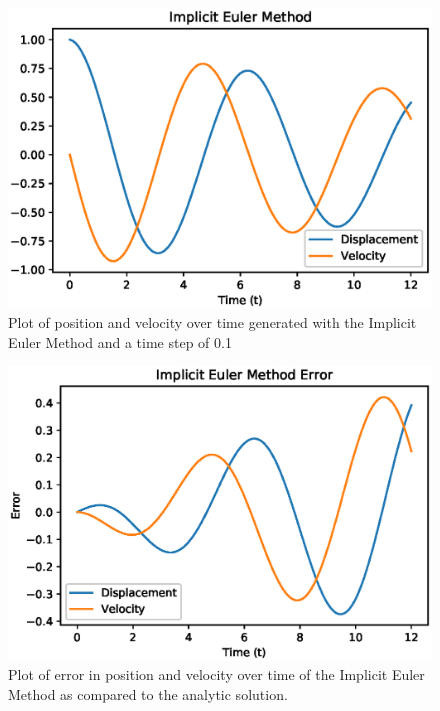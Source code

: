 \documentclass{article}
\begin{document}
\begin{figure}[ht]
\centering
\includegraphics[scale=0.35]{imp_euler.eps}
\caption{Plot of position and velocity over time generated with the Implicit Euler Method and a time step of 0.1}
\label{fig:impeuler}
\end{figure}

\begin{figure}[ht]
\centering
\includegraphics[scale=0.35]{imp_euler_err.eps}
\caption{Plot of error in position and velocity over time of the Implicit Euler Method as compared to the analytic solution.}
\label{fig:impeulererr}
\end{figure}
\end{document}
